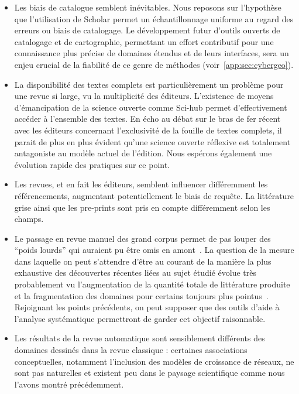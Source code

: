 \begin{itemize}
\item Les biais de catalogue semblent inévitables. Nous reposons sur l'hypothèse que l'utilisation de Scholar permet un échantillonnage uniforme au regard des erreurs ou biais de catalogage. Le développement futur d'outils ouverts de catalogage et de cartographie, permettant un effort contributif pour une connaissance plus précise de domaines étendus et de leurs interfaces, sera un enjeu crucial de la fiabilité de ce genre de méthodes (voir~\ref{app:sec:cybergeo}).
\item La disponibilité des textes complets est particulièrement un problème pour une revue si large, vu la multiplicité des éditeurs. L'existence de moyens d'émancipation de la science ouverte comme Sci-hub permet d'effectivement accéder à l'ensemble des textes. En écho au débat sur le bras de fer récent avec les éditeurs concernant l'exclusivité de la fouille de textes complets, il parait de plus en plus évident qu'une science ouverte réflexive est totalement antagoniste au modèle actuel de l'édition. Nous espérons également une évolution rapide des pratiques sur ce point.
\item Les revues, et en fait les éditeurs, semblent influencer différemment les référencements, augmentant potentiellement le biais de requête. La littérature grise ainsi que les pre-prints sont pris en compte différemment selon les champs.
\item Le passage en revue manuel des grand corpus permet de pas louper des ``poids lourds'' qui auraient pu être omis en amont~\cite{lissacksubliminal}. La question de la mesure dans laquelle on peut s'attendre d'être au courant de la manière la plus exhaustive des découvertes récentes liées au sujet étudié évolue très probablement vu l'augmentation de la quantité totale de littérature produite et la fragmentation des domaines pour certains toujours plus pointus~\cite{bastian2010seventy}. Rejoignant les points précédents, on peut supposer que des outils d'aide à l'analyse systématique permettront de garder cet objectif raisonnable.
\item Les résultats de la revue automatique sont sensiblement différents des domaines dessinés dans la revue classique : certaines associations conceptuelles, notamment l'inclusion des modèles de croissance de réseaux, ne sont pas naturelles et existent peu dans le paysage scientifique comme nous l'avons montré précédemment.
\end{itemize}


